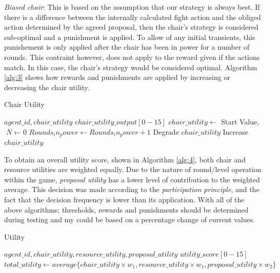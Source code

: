 \textit{Biased chair}: This is based on the assumption that our strategy is always best. If there is a difference between the internally calculated fight action and the obliged action determined by the agreed proposal, then the chair's strategy is considered sub-optimal and a punishment is applied. To allow of any initial transients, this punishement is only applied after the chair has been in power for a number of rounds. This contraint however, does not apply to the reward given if the actions match. In this case, the chair's strategy would be considered optimal. Algorithm \ref{alg:3} shows how rewards and punishments are applied by increasing or decreasing the chair utility. 

\begin{algorithm}
\caption{Chair Utility}\label{alg:3}
\begin{algorithmic} 
\scriptsize
\Require $agent\_id, chair\_utility$
\Ensure $chair\_utility\_output[0-15]$
\State $chair\_utility \leftarrow$ Start Value, $\; N \leftarrow 0$
\EndIf
{}
\State $Rounds_in_power \leftarrow Rounds_in_power+1$
\State Degrade $chair\_utility$
\EndIf
\EndIf
{}
\State Increase $chair\_utility$
\EndIf
\end{algorithmic}
\end{algorithm}

To obtain an overall utility score, shown in Algorithm \ref{alg:4}, both chair and resource utilities are weighted equally. Due to the nature of round/level operation within the game, \textit{proposal utility} has a lower level of contribution to the weighted average. This decision was made according to the \textit{participation principle}, and the fact that the decision frequency is lower than its application. With all of the above algorithms; thresholds, rewards and punishments should be determined during testing and my could be based on a percentage change of current values.                     


\begin{algorithm}
\caption{Utility}\label{alg:4}
\begin{algorithmic} 
\scriptsize
\Require $agent\_id, chair\_utility, resource\_utility, proposal\_utility$
\Ensure $utility\_score[0-15]$
\State $total\_utility \leftarrow average\{chair\_utility \times w_1, resource\_utility \times w_1, proposal\_utility \times w_2\}$
\EndIf
\end{algorithmic}
\end{algorithm}


